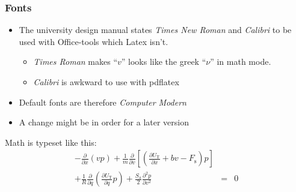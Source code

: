 \documentclass[aspectratio=169]{beamer}
\begin{document}
\begin{frame}
\frametitle{Fonts}
\begin{itemize}
\item The university design manual states \textit{Times New Roman} and \textit{Calibri} to be used with Office-tools which Latex isn't.  
\begin{itemize}
\item \textit{Times Roman} makes ``$v$'' looks like the greek ``$\nu$'' in math mode. 
\item \textit{Calibri} is awkward to use with pdflatex 
\end{itemize}
\item Default fonts are therefore \textit{Computer Modern}
\item A change might be in order for a later version 
\end{itemize}
\vspace{5mm}

Math is typeset like this:
\begin{eqnarray}
-\frac{\partial}{\partial x}\left(vp\right)
+\frac{1}{m}\frac{\partial}{\partial v}\left[\left( \frac{\partial U_\mathrm{T}}{\partial x} +bv-F_\mathrm{s}\right)p\right] \nonumber \\
+\frac{1}{R}\frac{\partial}{\partial q}\left( \frac{\partial U_\mathrm{T}}{\partial q}p\right)
+ \frac{S_\mathrm{a}}{2}\frac{\partial^2p}{\partial v^2} & = & 0 \nonumber
\end{eqnarray}
\end{frame}
\end{document}
